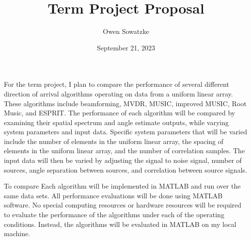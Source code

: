 \documentclass{article}
\title{Term Project Proposal}
\author{Owen Sowatzke}
\date{September 21, 2023}
\begin{document}
	\maketitle

	For the term project, I plan to compare the performance of several different direction of arrival algorithms operating on data from a uniform linear array. These algorithms include beamforming, MVDR, MUSIC, improved MUSIC, Root Music, and ESPRIT. The performance of each algorithm will be compared by examining their spatial spectrum and angle estimate outputs, while varying system parameters and input data. Specific system parameters that will be varied include the number of elements in the uniform linear array, the spacing of elements in the uniform linear array, and the number of correlation samples. The input data will then be varied by adjusting the signal to noise signal, number of sources, angle separation between sources, and correlation between source signals.
	
	
	
	
	To compare Each algorithm will be implemented in MATLAB and run over the same data sets. 
	All performance evaluations will be done using MATLAB software.  No special computing resources or hardware resources will be required to evaluate the performance of the algorithms under each of the operating conditions. Instead, the algorithms will be evaluated in MATLAB on my local machine.
	
\end{document}

